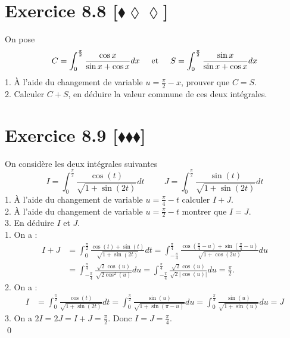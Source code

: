 \documentclass[10pt]{article}
\begin{document}
\section*{Exercice 8.8 [$\blacklozenge\lozenge\lozenge$]}
\begin{tcolorbox}[enhanced, width=7in, center, size=fbox, fontupper=\large, drop shadow southwest]
    On pose
    \begin{equation*}
        C=\int_0^{\frac{\pi}{2}}{\frac{\cos x}{\sin x + \cos x}dx} \hspace{0.5cm} \text{et} \hspace{0.5cm} S=\int_0^{\frac{\pi}{2}}{\frac{\sin x}{\sin x + \cos x}dx}
    \end{equation*}
    1. À l'aide du changement de variable $u=\frac{\pi}{2}-x$, prouver que $C=S$.\\
    2. Calculer $C + S$, en déduire la valeur commune de ces deux intégrales.
\end{tcolorbox}


\section*{Exercice 8.9 [$\blacklozenge\blacklozenge\blacklozenge$]}
\begin{tcolorbox}[enhanced, width=7in, center, size=fbox, fontupper=\large, drop shadow southwest]
    On considère les deux intégrales suivantes
    \begin{equation*}
        I=\int_0^{\frac{\pi}{2}}{\frac{\cos(t)}{\sqrt{1+\sin(2t)}}dt} \hspace{1cm} J=\int_0^{\frac{\pi}{2}}{\frac{\sin(t)}{\sqrt{1+\sin(2t)}}dt}
    \end{equation*}
    1. À l'aide du changement de variable $u=\frac{\pi}{4}-t$ calculer $I+J$.\\
    2. À l'aide du changement de variable $u=\frac{\pi}{2}-t$ montrer que $I=J$.\\
    3. En déduire $I$ et $J$.\\[0.1cm]
    1. On a :
    \begin{align*}
        I + J &= \int_0^{\frac{\pi}{2}}{\frac{\cos(t) + \sin(t)}{\sqrt{1+\sin(2t)}}dt}=\int_{-\frac{\pi}{4}}^{\frac{\pi}{4}}{\frac{\cos(\frac{\pi}{4}-u)+\sin(\frac{\pi}{4}-u)}{\sqrt{1+\cos(2u)}}du}\\
        &=\int_{-\frac{\pi}{4}}^{\frac{\pi}{4}}{\frac{\sqrt{2}\cos(u)}{\sqrt{2\cos^2(u)}}du}=\int_{-\frac{\pi}{4}}^{\frac{\pi}{4}}{\frac{\sqrt{2}\cos(u)}{\sqrt{2}|\cos(u)|}du}=\frac{\pi}{2}.
    \end{align*}
    2. On a :
    \begin{align*}
        I &= \int_0^{\frac{\pi}{2}}{\frac{\cos(t)}{\sqrt{1+\sin(2t)}}dt}=\int_0^{\frac{\pi}{2}}{\frac{\sin(u)}{\sqrt{1+\sin(\pi-u)}}du}=\int_0^{\frac{\pi}{2}}{\frac{\sin(u)}{\sqrt{1+\sin(u)}}du}=J
    \end{align*}
    3. On a $2I = 2J = I+J = \frac{\pi}{2}$. Donc $I = J = \frac{\pi}{4}$.\\
    \qed
\end{tcolorbox}
\end{document}
